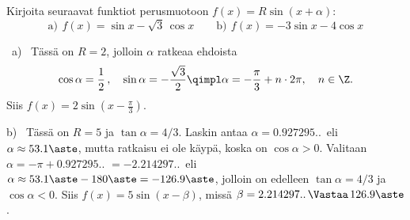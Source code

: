 \begin{Exa} Kirjoita seuraavat funktiot perusmuotoon $f(x)=R\sin(x+\alpha)$:
\[
\text{a)}\,\ f(x) = \sin x - \sqrt{3}\,\cos x \qquad \text{b)}\,\ f(x)=-3\sin x - 4\cos x
\]
\end{Exa}
\ratk \ a) \ Tässä on $R=2$, jolloin $\alpha$ ratkeaa ehdoista
\[
\cos\alpha = \frac{1}{2}\,, \quad \sin\alpha = -\frac{\sqrt{3}}{2} \qimpl \alpha 
                                             = -\frac{\pi}{3} + n\cdot 2\pi, \quad n\in\Z.
\]
Siis $f(x) = 2\sin(x-\tfrac{\pi}{3})$.

b) \ Tässä on $R=5$ ja $\tan\alpha=4/3$. Laskin antaa $\alpha=0.927295..\,$ eli 
$\alpha \approx 53.1\aste$, mutta ratkaisu ei ole käypä, koska on $\cos\alpha>0$. Valitaan 
$\alpha=-\pi+0.927295..$ $=-2.214297..\,$ eli $\alpha \approx 53.1\aste-180\aste=-126.9\aste$,
jolloin on edelleen $\tan\alpha=4/3$ ja $\cos\alpha<0$. Siis $f(x)=5\sin(x-\beta)$, missä 
$\beta=2.214297..\,\Vastaa\, 126.9\aste$. \loppu

